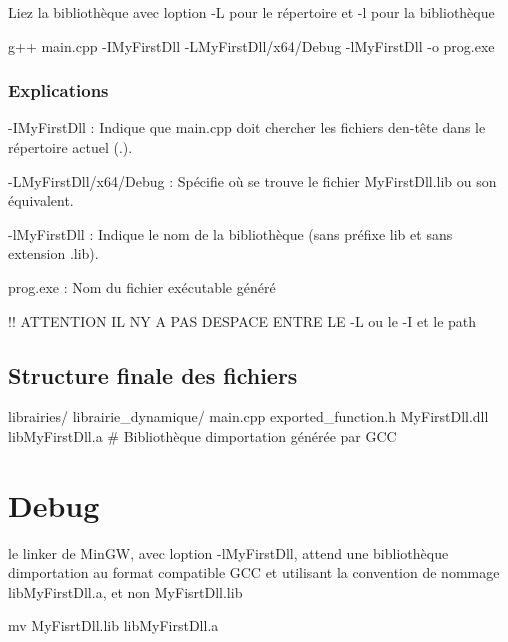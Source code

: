 Liez la bibliothèque avec l\textquotesingle{}option -\/L pour le répertoire et -\/l pour la bibliothèque


\begin{DoxyCode}
g++ main.cpp -IMyFirstDll -LMyFirstDll/x64/Debug -lMyFirstDll -o prog.exe
\end{DoxyCode}


\subsubsection*{Explications}


\begin{DoxyItemize}
\item -\/\+I\+My\+First\+Dll \+: Indique que main.\+cpp doit chercher les fichiers d\textquotesingle{}en-\/tête dans le répertoire actuel (.).
\item -\/\+L\+My\+First\+Dll/x64/\+Debug \+: Spécifie où se trouve le fichier My\+First\+Dll.\+lib ou son équivalent.
\item -\/l\+My\+First\+Dll \+: Indique le nom de la bibliothèque (sans préfixe lib et sans extension .lib).
\end{DoxyItemize}

prog.\+exe \+: Nom du fichier exécutable généré

!! A\+T\+T\+E\+N\+T\+I\+ON IL N\textquotesingle{}Y A P\+AS D\textquotesingle{}E\+S\+P\+A\+CE E\+N\+T\+RE LE -\/L ou le -\/I et le path

\subsection*{Structure finale des fichiers}

librairies/ librairie\+\_\+dynamique/ main.\+cpp exported\+\_\+function.\+h My\+First\+Dll.\+dll lib\+My\+First\+Dll.\+a \# Bibliothèque d\textquotesingle{}importation générée par G\+CC

\section*{Debug}

le linker de Min\+GW, avec l\textquotesingle{}option -\/l\+My\+First\+Dll, attend une bibliothèque d\textquotesingle{}importation au format compatible G\+CC et utilisant la convention de nommage lib\+My\+First\+Dll.\+a, et non My\+Fisrt\+Dll.\+lib


\begin{DoxyCode}
mv MyFisrtDll.lib libMyFirstDll.a
\end{DoxyCode}


